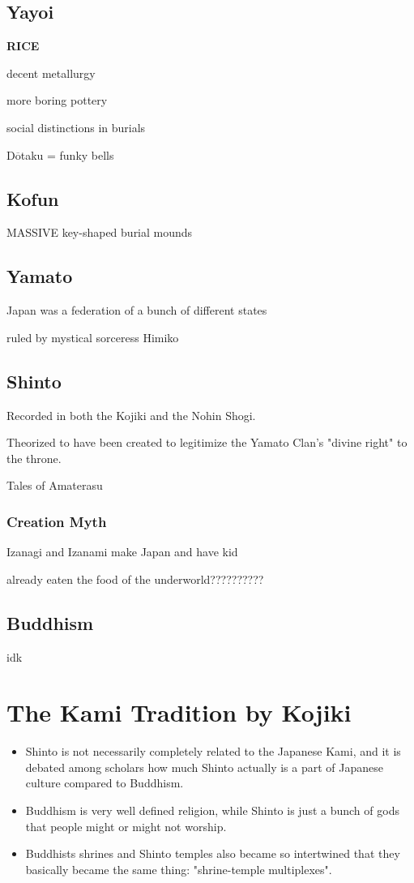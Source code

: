 \documentclass{report}
\newcommand{\textoverline}[1]{$\overline{\mbox{#1}}$}
\begin{document}
\section{Yayoi}
\textbf{RICE}

decent metallurgy

more boring pottery

social distinctions in burials

D\textoverline{o}taku = funky bells

\section{Kofun}
MASSIVE key-shaped burial mounds

\section{Yamato}
Japan was a federation of a bunch of different states

ruled by mystical sorceress Himiko

\section{Shinto}
Recorded in both the Kojiki and the Nohin Shogi.

Theorized to have been created to legitimize the Yamato Clan's "divine right" to the throne.

Tales of Amaterasu

\subsection{Creation Myth}

Izanagi and Izanami make Japan and have kid

already eaten the food of the underworld??????????

\section{Buddhism}
idk

\chapter{The Kami Tradition by Kojiki}
\begin{itemize}
\item
Shinto is not necessarily completely related to the Japanese Kami, and it is debated among scholars how much Shinto actually is a part of Japanese culture compared to Buddhism. 
\item
Buddhism is very well defined religion, while Shinto is just a bunch of gods that people might or might not worship. 
\item
Buddhists shrines and Shinto temples also became so intertwined that they basically became the same thing: "shrine-temple multiplexes".
\end{itemize}
\end{document}
